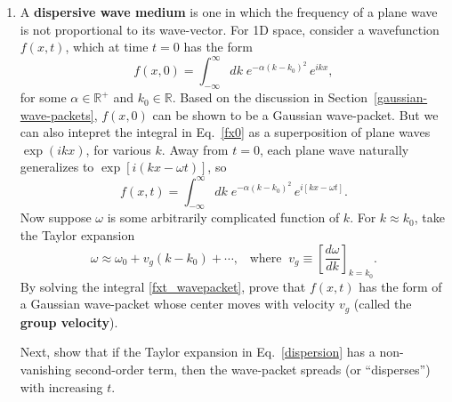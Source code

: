 \documentclass[10pt,a4paper]{article}
\begin{document}
\begin{enumerate}
\item A \textbf{dispersive wave medium} is one in which the frequency
  of a plane wave is not proportional to its wave-vector.  For 1D
  space, consider a wavefunction $f(x,t)$, which at time $t = 0$ has
  the form
  \begin{equation}
    f(x, 0) = \int_{-\infty}^\infty dk \; e^{-\alpha(k-k_0)^2} \, e^{ikx},
    \label{fx0}
  \end{equation}
  for some $\alpha \in \mathbb{R}^+$ and $k_0 \in \mathbb{R}$.  Based
  on the discussion in Section~\ref{gaussian-wave-packets}, $f(x,0)$
  can be shown to be a Gaussian wave-packet.  But we can also intepret
  the integral in Eq.~\eqref{fx0} as a superposition of plane waves
  $\exp(ikx)$, for various $k$.  Away from $t = 0$, each plane wave
  naturally generalizes to $\exp[i(kx - \omega t)]$, so
  \begin{equation}
    f(x, t) = \int_{-\infty}^\infty dk \; e^{-\alpha(k-k_0)^2} \, e^{i[kx-\omega t]}. \label{fxt_wavepacket}
  \end{equation}
  Now suppose $\omega$ is some arbitrarily complicated function of
  $k$.  For $k \approx k_0$, take the Taylor expansion
  \begin{equation}
    \omega \approx \omega_0 + v_g (k-k_0) + \cdots,
    \;\;\; \mathrm{where}\;\;
    v_g \equiv \left[\frac{d\omega}{dk}\right]_{k=k_0}.
    \label{dispersion}
  \end{equation}
  By solving the integral \eqref{fxt_wavepacket}, prove that $f(x, t)$
  has the form of a Gaussian wave-packet whose center moves with
  velocity $v_g$ (called the \textbf{group velocity}).

  Next, show that if the Taylor expansion in Eq.~\eqref{dispersion}
  has a non-vanishing second-order term, then the wave-packet spreads
  (or ``disperses'') with increasing $t$.
  
\end{enumerate}
    
\end{document}
